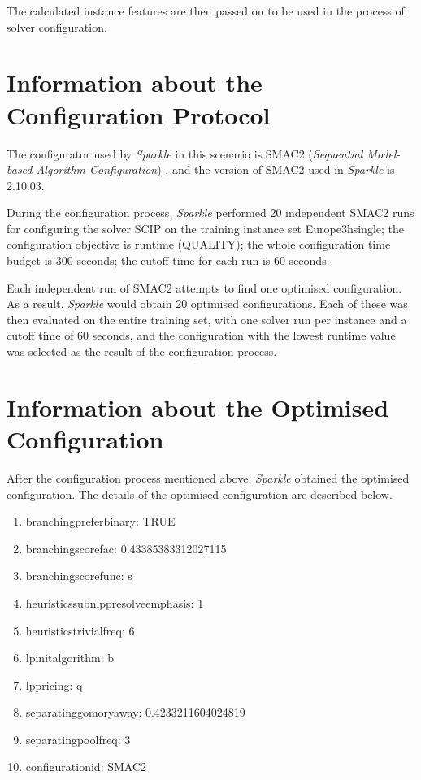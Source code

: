 \documentclass[british]{article}
\newif\iffeatures
\begin{document}
        The calculated instance features are then passed on to be used in the process of solver configuration. 

\fi


\section{Information about the Configuration Protocol}

The configurator used by \emph{Sparkle} in this scenario is SMAC2 ({\em Sequential Model-based Algorithm Configuration}) \cite{SMAC2}, and the version of SMAC2 used in \emph{Sparkle} is 2.10.03.

During the configuration process, \emph{Sparkle} performed 20 independent SMAC2 runs for configuring the solver SCIP on the training instance set Europe\textunderscore 3h\textunderscore single\iffeatures; the instance features of the training instance set were used for configuration\fi; the configuration objective is runtime (QUALITY); the whole configuration time budget is 300 seconds; the cutoff time for each run is 60 seconds.

Each independent run of SMAC2 attempts to find one optimised configuration. As a result, \emph{Sparkle} would obtain 20 optimised configurations. Each of these was then evaluated on the entire training set, with one solver run per instance and a cutoff time of 60 seconds, and the configuration with the lowest runtime value was selected as the result of the configuration process.

\section{Information about the Optimised Configuration}

After the configuration process mentioned above, \emph{Sparkle} obtained the optimised configuration. The details of the optimised configuration are described below.

\vspace{5mm}

\begin{enumerate}
\item branching\textunderscore preferbinary: TRUE
\item branching\textunderscore scorefac: 0.43385383312027115
\item branching\textunderscore scorefunc: s
\item heuristics\textunderscore subnlp\textunderscore presolveemphasis: 1
\item heuristics\textunderscore trivial\textunderscore freq: 6
\item lp\textunderscore initalgorithm: b
\item lp\textunderscore pricing: q
\item separating\textunderscore gomory\textunderscore away: 0.4233211604024819
\item separating\textunderscore poolfreq: 3
\item configuration\textunderscore id: SMAC2

\end{enumerate}
\end{document}
